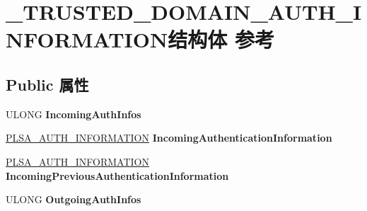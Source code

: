 \hypertarget{struct___t_r_u_s_t_e_d___d_o_m_a_i_n___a_u_t_h___i_n_f_o_r_m_a_t_i_o_n}{}\section{\+\_\+\+T\+R\+U\+S\+T\+E\+D\+\_\+\+D\+O\+M\+A\+I\+N\+\_\+\+A\+U\+T\+H\+\_\+\+I\+N\+F\+O\+R\+M\+A\+T\+I\+O\+N结构体 参考}
\label{struct___t_r_u_s_t_e_d___d_o_m_a_i_n___a_u_t_h___i_n_f_o_r_m_a_t_i_o_n}
\subsection*{Public 属性}
\begin{DoxyCompactItemize}
\item 
\mbox{\label{struct___t_r_u_s_t_e_d___d_o_m_a_i_n___a_u_t_h___i_n_f_o_r_m_a_t_i_o_n_a8e0df0c5bee6d7faef3a03ba9fca52df}} 
U\+L\+O\+NG {\bfseries Incoming\+Auth\+Infos}
\item 
\mbox{\label{struct___t_r_u_s_t_e_d___d_o_m_a_i_n___a_u_t_h___i_n_f_o_r_m_a_t_i_o_n_a6b819703982b3a8194174f01719921b6}} 
\hyperlink{struct___l_s_a___a_u_t_h___i_n_f_o_r_m_a_t_i_o_n}{P\+L\+S\+A\+\_\+\+A\+U\+T\+H\+\_\+\+I\+N\+F\+O\+R\+M\+A\+T\+I\+ON} {\bfseries Incoming\+Authentication\+Information}
\item 
\mbox{\label{struct___t_r_u_s_t_e_d___d_o_m_a_i_n___a_u_t_h___i_n_f_o_r_m_a_t_i_o_n_a240c3371a790f4b27bc46e643b5b7cd9}} 
\hyperlink{struct___l_s_a___a_u_t_h___i_n_f_o_r_m_a_t_i_o_n}{P\+L\+S\+A\+\_\+\+A\+U\+T\+H\+\_\+\+I\+N\+F\+O\+R\+M\+A\+T\+I\+ON} {\bfseries Incoming\+Previous\+Authentication\+Information}
\item 
\mbox{\label{struct___t_r_u_s_t_e_d___d_o_m_a_i_n___a_u_t_h___i_n_f_o_r_m_a_t_i_o_n_a896db3ba05412400d6d7aefb1535d351}} 
U\+L\+O\+NG {\bfseries Outgoing\+Auth\+Infos}
\item 
\mbox{\label{struct___t_r_u_s_t_e_d___d_o_m_a_i_n___a_u_t_h___i_n_f_o_r_m_a_t_i_o_n_aad50658d86299f54de8584a5ca301d47}} 

\end{DoxyCompactItemize}
